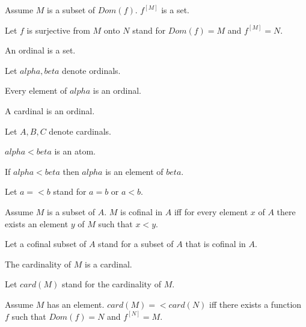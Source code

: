 \documentclass{article}
\begin{document}
\begin{forthel}
    \begin{axiom}
      Assume $M$ is a subset of $Dom(f)$. $f^[M]$ is a set.
    \end{axiom}

    Let $f$ is surjective from $M$ onto $N$ stand for $Dom(f) = M$ and $f^[M] = N$.

    \begin{signature}
      An ordinal is a set.
    \end{signature}

    Let $alpha, beta$ denote ordinals.

    \begin{axiom}
      Every element of $alpha$ is an ordinal.
    \end{axiom}

    \begin{signature}
      A cardinal is an ordinal.
    \end{signature}

    Let $A,B,C$ denote cardinals.

    \begin{signature}
      $alpha < beta$ is an atom.
    \end{signature}

    \begin{axiom}
      If $alpha < beta$ then $alpha$ is an element of $beta$.
    \end{axiom}

    Let $a =< b$ stand for $a = b$ or $a < b$.

    \begin{definition}
      Assume $M$ is a subset of $A$. $M$ is cofinal in $A$ iff for every element $x$ of $A$ there exists an element $y$ of $M$ such that $x < y$.
    \end{definition}

    Let a cofinal subset of $A$ stand for a subset of $A$ that is cofinal in $A$.

    \begin{signature}
      The cardinality of $M$ is a cardinal.
    \end{signature}

    Let $card(M)$ stand for the cardinality of $M$.

    \begin{axiom}[SurjExi]
      Assume $M$ has an element. $card(M) =< card(N)$ iff there exists a function $f$ such that $Dom(f) = N$ and $f^[N] = M$.
    \end{axiom}


\end{forthel}
\end{document}
